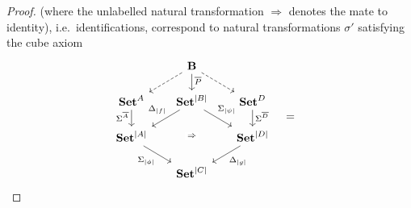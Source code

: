 \documentclass[11pt, oneside, article]{memoir}
\theoremstyle{plain}
\theoremstyle{definition}
\theoremstyle{remark}
\DeclarePairedDelimiter{\abs}{\lvert}{\rvert}
\newcommand{\namedcat}[1]{\mathbf{#1}}
\newcommand{\cat}[1]{\mathbf{#1}}
\newcommand{\Set}{\namedcat{Set}}
\newcommand{\CoalgOn}[2]{{#2}^{#1}}
\newcommand{\CoalgSet}[1]{\CoalgOn{#1}{\Set}}
\newcommand{\clift}[1]{\overline{#1}}
\newcommand{\pts}[1]{{\abs{#1}}}
\newcommand{\one}[1]{\pts{#1}}
\newcommand{\ptlift}[1]{\overline{#1}}
\newcommand{\carr}{\Sigma}
\newcommand{\leindex}[1]{\Sigma_{#1}}
\newcommand{\reindex}[1]{\Delta_{#1}}
\newcommand{\car}[1]{\carr^{#1}}
\newcommand{\ph}[1]{#1}
\newcommand{\com}[2]{{#1}^{#2}}
\newcommand{\con}[2]{{#1}^{#2}}
\newcommand{\cmnd}[1]{{#1}}
\newcommand{\cA}{\cmnd{A}}
\newcommand{\cB}{\cmnd{B}}
\newcommand{\cC}{\cmnd{C}}
\newcommand{\cD}{\cmnd{D}}
\newcommand{\bB}{\cat{B}}
\newcommand{\pP}{\ph{P}}
\newcommand{\ASet}{\CoalgSet{\cA}}
\newcommand{\CSet}{\CoalgSet{\cC}}
\newcommand{\DSet}{\CoalgSet{\cD}}
\newcommand{\SetpA}{\Set^\pts{\cA}}
\newcommand{\SetpB}{\Set^\pts{\cB}}
\newcommand{\SetpC}{\Set^\pts{\cC}}
\newcommand{\SetpD}{\Set^\pts{\cD}}
\begin{document}
\begin{proof}
  (where the unlabelled natural transformation $\Rightarrow$ denotes
  the mate to identity), i.e.\ identifications, correspond to natural
  transformations $\sigma'$ satisfying the cube axiom
  \[
    \begin{tikzcd}[column sep=17, row sep=15]
      & \bB & \\
      \ASet & \SetpB & \DSet \\
      \SetpA && \SetpD \\
      & \SetpC
      \arrow[dashed, from=1-2, to=2-1]
      \arrow["{\ptlift{\pP}}"{pos=0.4}, from=1-2, to=2-2]
      \arrow[dashed, from=1-2, to=2-3]
      \arrow["\car{\clift{\cA}}"'{pos=0.4}, from=2-1, to=3-1]
      \arrow["{\reindex{\one{f}}}"'{pos=0.4}, from=2-2, to=3-1]
      \arrow["{\leindex{\one{\psi}}}"{pos=0.4}, from=2-2, to=3-3]
      \arrow["\Rightarrow"{description}, draw=none, from=2-2, to=4-2]
      \arrow["\car{\clift{\cD}}"{pos=0.4}, from=2-3, to=3-3]
      \arrow["{\leindex{\one{\phi}}}"', from=3-1, to=4-2]
      \arrow["{\reindex{\one{g}}}", from=3-3, to=4-2]
    \end{tikzcd}
    \;\;\; = \;\;\;
    \begin{tikzcd}[column sep=17, row sep=15]

\end{tikzcd}\]
\end{proof}
\end{document}
